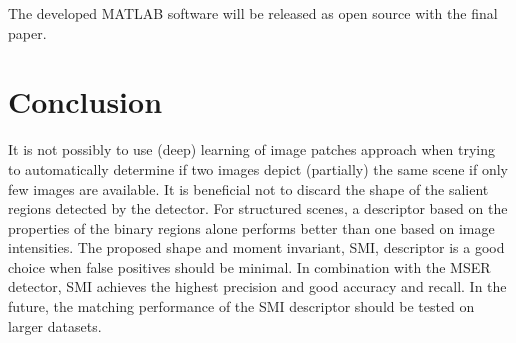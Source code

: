 \documentclass[a4paper,11pt]{article}
\begin{document}
The developed MATLAB software will be released as open source with the final paper.
\section{Conclusion}
It is not possibly to use (deep) learning of image patches approach when trying to automatically determine if two images depict (partially) the same scene if only few images are available. It is beneficial not to discard the shape of the salient regions detected by the detector. For structured scenes, a descriptor based on the properties of the binary regions alone performs better than one based on image intensities.  The proposed shape and moment invariant, SMI, descriptor is a good choice when false positives should be minimal. In combination with the MSER detector, SMI achieves the highest precision and good accuracy and recall. In the future, the matching performance of the SMI descriptor should be tested on larger datasets.










\footnotesize



\end{document}
